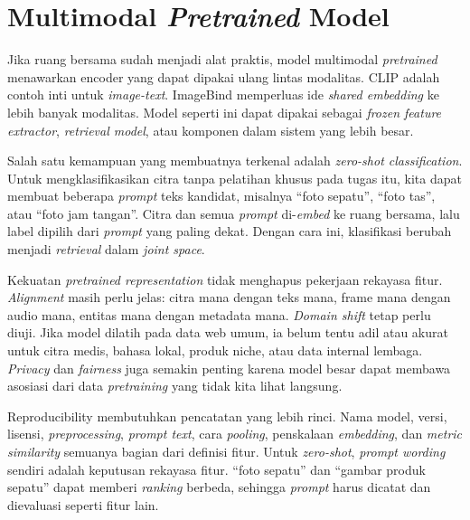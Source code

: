 \section{\texorpdfstring{Multimodal \emph{Pretrained} Model}{Multimodal Pretrained Model}}\label{multimodal-pretrained-model}

Jika ruang bersama sudah menjadi alat praktis, model multimodal \emph{pretrained} menawarkan encoder yang dapat dipakai ulang lintas modalitas. CLIP adalah contoh inti untuk \emph{image-text}. ImageBind memperluas ide \emph{shared embedding} ke lebih banyak modalitas. Model seperti ini dapat dipakai sebagai \emph{frozen feature extractor}, \emph{retrieval model}, atau komponen dalam sistem yang lebih besar.

Salah satu kemampuan yang membuatnya terkenal adalah \emph{zero-shot classification}. Untuk mengklasifikasikan citra tanpa pelatihan khusus pada tugas itu, kita dapat membuat beberapa \emph{prompt} teks kandidat, misalnya ``foto sepatu'', ``foto tas'', atau ``foto jam tangan''. Citra dan semua \emph{prompt} di-\emph{embed} ke ruang bersama, lalu label dipilih dari \emph{prompt} yang paling dekat. Dengan cara ini, klasifikasi berubah menjadi \emph{retrieval} dalam \emph{joint space}.

Kekuatan \emph{pretrained representation} tidak menghapus pekerjaan rekayasa fitur. \emph{Alignment} masih perlu jelas: citra mana dengan teks mana, frame mana dengan audio mana, entitas mana dengan metadata mana. \emph{Domain shift} tetap perlu diuji. Jika model dilatih pada data web umum, ia belum tentu adil atau akurat untuk citra medis, bahasa lokal, produk niche, atau data internal lembaga. \emph{Privacy} dan \emph{fairness} juga semakin penting karena model besar dapat membawa asosiasi dari data \emph{pretraining} yang tidak kita lihat langsung.

Reproducibility membutuhkan pencatatan yang lebih rinci. Nama model, versi, lisensi, \emph{preprocessing}, \emph{prompt text}, cara \emph{pooling}, penskalaan \emph{embedding}, dan \emph{metric similarity} semuanya bagian dari definisi fitur. Untuk \emph{zero-shot}, \emph{prompt wording} sendiri adalah keputusan rekayasa fitur. ``foto sepatu'' dan ``gambar produk sepatu'' dapat memberi \emph{ranking} berbeda, sehingga \emph{prompt} harus dicatat dan dievaluasi seperti fitur lain.

